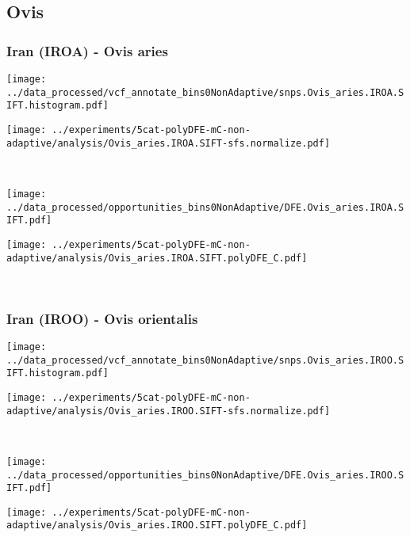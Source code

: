 \subsection{Ovis}

\subsubsection{Iran (IROA) - Ovis aries}

\begin{minipage}{0.49\linewidth}
    \texttt{[image: ../data\_processed/vcf\_annotate\_bins0NonAdaptive/snps.Ovis\_aries.IROA.SIFT.histogram.pdf]}
\end{minipage}
\begin{minipage}{0.49\linewidth}
    \texttt{[image: ../experiments/5cat-polyDFE-mC-non-adaptive/analysis/Ovis\_aries.IROA.SIFT-sfs.normalize.pdf]}
\end{minipage}
\\
\begin{minipage}{0.49\linewidth}
    \texttt{[image: ../data\_processed/opportunities\_bins0NonAdaptive/DFE.Ovis\_aries.IROA.SIFT.pdf]}
\end{minipage}
\begin{minipage}{0.49\linewidth}
    \texttt{[image: ../experiments/5cat-polyDFE-mC-non-adaptive/analysis/Ovis\_aries.IROA.SIFT.polyDFE\_C.pdf]}
\end{minipage}
\\

\subsubsection{Iran (IROO) - Ovis orientalis}

\begin{minipage}{0.49\linewidth}
    \texttt{[image: ../data\_processed/vcf\_annotate\_bins0NonAdaptive/snps.Ovis\_aries.IROO.SIFT.histogram.pdf]}
\end{minipage}
\begin{minipage}{0.49\linewidth}
    \texttt{[image: ../experiments/5cat-polyDFE-mC-non-adaptive/analysis/Ovis\_aries.IROO.SIFT-sfs.normalize.pdf]}
\end{minipage}
\\
\begin{minipage}{0.49\linewidth}
    \texttt{[image: ../data\_processed/opportunities\_bins0NonAdaptive/DFE.Ovis\_aries.IROO.SIFT.pdf]}
\end{minipage}
\begin{minipage}{0.49\linewidth}
    \texttt{[image: ../experiments/5cat-polyDFE-mC-non-adaptive/analysis/Ovis\_aries.IROO.SIFT.polyDFE\_C.pdf]}
\end{minipage}
\\

